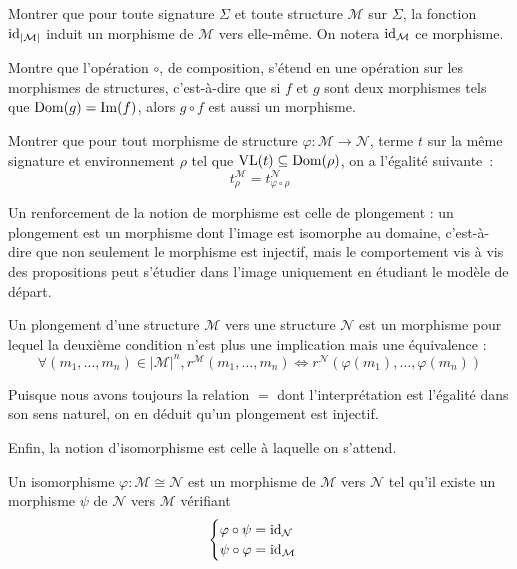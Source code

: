 \begin{exercise}
  Montrer que pour toute signature $\Sigma$ et toute structure $\mathcal M$ sur
  $\Sigma$, la fonction $\operatorname{id}_{|\mathcal M|}$ induit un morphisme de $\mathcal M$
  vers elle-même. On notera $\operatorname{id}_\mathcal M$ ce morphisme.
\end{exercise}

\begin{exercise}
  Montre que l'opération $\circ$, de composition, s'étend en une opération sur
  les morphismes de structures, c'est-à-dire que si $f$ et $g$ sont deux
  morphismes tels que $\operatorname{Dom}(g) = \operatorname{Im}(f)$, alors $g\circ f$ est aussi un
  morphisme.
\end{exercise}

\begin{exercise}\label{pred.exo.morph.val}
  Montrer que pour tout morphisme de structure
  $\varphi : \mathcal M \to \mathcal N$, terme $t$ sur la même signature et
  environnement $\rho$ tel que $\operatorname{VL}(t) \subseteq \operatorname{Dom}(\rho)$, on a l'égalité
  suivante~:
  \[t_\rho^\mathcal M = t_{\varphi\circ\rho}^\mathcal N\]
\end{exercise}

Un renforcement de la notion de morphisme est celle de plongement : un
plongement est un morphisme dont l'image est isomorphe au domaine, c'est-à-dire
que non seulement le morphisme est injectif, mais le comportement vis à vis
des propositions peut s'étudier dans l'image uniquement en étudiant le modèle de
départ.

\begin{definition}[Plongement]
  Un plongement d'une structure $\mathcal M$ vers une structure $\mathcal N$ est
  un morphisme pour lequel la deuxième condition n'est plus une implication mais
  une équivalence :
  \[\forall(m_1,\ldots,m_n)\in|\mathcal M|^n,r^{\mathcal M}(m_1,\ldots,m_n) \iff
  r^{\mathcal N}(\varphi(m_1),\ldots,\varphi(m_n))\]
\end{definition}

\begin{remark}
  Puisque nous avons toujours la relation $=$ dont l'interprétation est
  l'égalité dans son sens naturel, on en déduit qu'un plongement est injectif.
\end{remark}

Enfin, la notion d'isomorphisme est celle à laquelle on s'attend.

\begin{definition}[Isomorphisme]
  Un isomorphisme $\varphi : \mathcal M \cong \mathcal N$ est un morphisme de
  $\mathcal M$ vers $\mathcal N$ tel qu'il existe un morphisme $\psi$ de
  $\mathcal N$ vers $\mathcal M$ vérifiant
  \[\begin{cases}
  \varphi\circ \psi = \operatorname{id}_{\mathcal N}\\
  \psi\circ\varphi = \operatorname{id}_{\mathcal M}
  \end{cases}\]
\end{definition}

